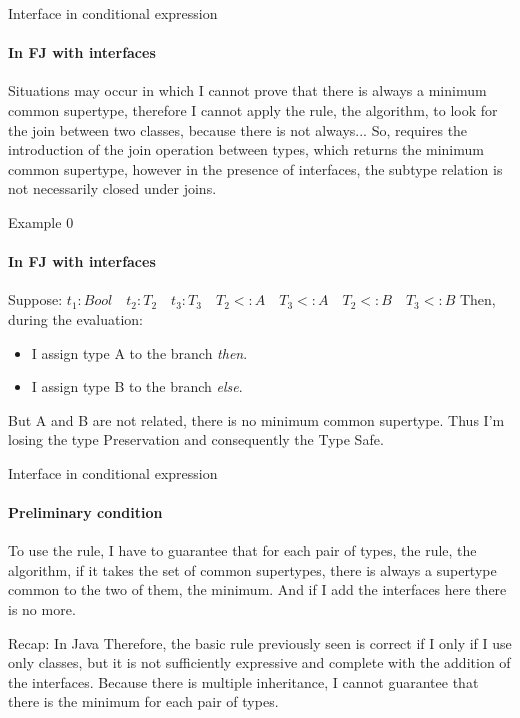 \documentclass{beamer}
\begin{document}
\begin{frame}{Interface in conditional expression}
    \framesubtitle{In FJ with interfaces}
    Situations may occur in which I cannot prove that there is always a minimum common supertype, therefore I cannot apply the rule, the algorithm, to look for the join between two classes, because there is not always...\newline
 So, requires the introduction of the join operation between types, which returns the minimum common supertype, however in the presence of interfaces, the subtype relation is not necessarily closed under joins. 
\end{frame}

\begin{frame}{Example 0}
    \framesubtitle{In FJ with interfaces}
Suppose: $t_1 : Bool \quad t_2 : T_2 \quad t_3 : T_3 \quad T_2 <:A \quad T_3 <: A \quad T_2 <: B \quad T_3 <: B$
Then, during the evaluation:
\begin{itemize}
    \item I assign type A to the branch \textit{then}.
    \item I assign type B to the branch \textit{else}.
\end{itemize}
But A and B are not related, there is no minimum common supertype. Thus I'm losing the type Preservation and consequently the Type Safe.

\begin{center}
\end{center}
\end{frame}

\begin{frame}{Interface in conditional expression}
\framesubtitle{Preliminary condition}
    To use the rule, I have to guarantee that for each pair of types, the rule, the algorithm, if it takes the set of common supertypes, there is always a supertype common to the two of them, the minimum.\newline
And if I add the interfaces here there is no more.
\end{frame}
\begin{frame}{Recap: In Java}
Therefore, the basic rule previously seen is correct if I only if I use only classes, but it is not sufficiently expressive and complete with the addition of the interfaces.\newline\newline
Because there is multiple inheritance, I cannot guarantee that there is the minimum for each pair of types.
    
\end{frame}
\end{document}
